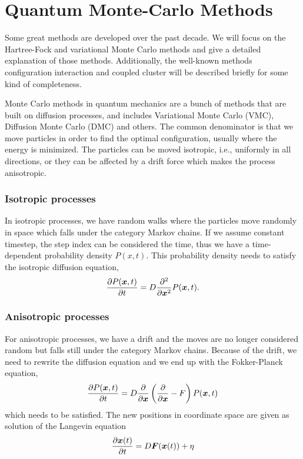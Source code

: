 \chapter{Quantum Monte-Carlo Methods} \label{chp:methods}
Some great methods are developed over the past decade. We will focus on the Hartree-Fock and variational Monte Carlo methods and give a detailed explanation of those methods. Additionally, the well-known methods configuration interaction and coupled cluster will be described briefly for some kind of completeness. 

Monte Carlo methods in quantum mechanics are a bunch of methods that are built on diffusion processes, and includes Variational Monte Carlo (VMC), Diffusion Monte Carlo (DMC) and others. The common denominator is that we move particles in order to find the optimal configuration, usually where the energy is minimized. The particles can be moved isotropic, i.e., uniformly in all directions, or they can be affected by a drift force which makes the process anisotropic. 

\subsection{Isotropic processes}
In isotropic processes, we have random walks where the particles move randomly in space which falls under the category Markov chains. If we assume constant timestep, the step index can be considered the time, thus we have a time-dependent probability density $P(x,t)$. This probability density needs to satisfy the isotropic diffusion equation,
\begin{equation}
\frac{\partial P(\boldsymbol{{x}},t)}{\partial t}=D\frac{\partial^2}{\partial \boldsymbol{{x}}^2}P(\boldsymbol{{x}},t).
\end{equation}

\subsection{Anisotropic processes}
For anisotropic processes, we have a drift and the moves are no longer considered random but falls still under the category Markov chains. Because of the drift, we need to rewrite the diffusion equation and we end up with the Fokker-Planck equation,
\begin{equation}
\frac{\partial P(\boldsymbol{{x}},t)}{\partial t}=D\frac{\partial}{\partial \boldsymbol{{x}}}\left(\frac{\partial}{\partial \boldsymbol{{x}}}-F\right)P(\boldsymbol{{x}},t)
\end{equation}
which needs to be satisfied. The new positions in coordinate space are given as solution of the Langevin equation 
\begin{equation}
\frac{\partial \boldsymbol{{x}}(t)}{\partial t}=D\boldsymbol{{F}}(\boldsymbol{{x}}(t))+\eta
\end{equation}

